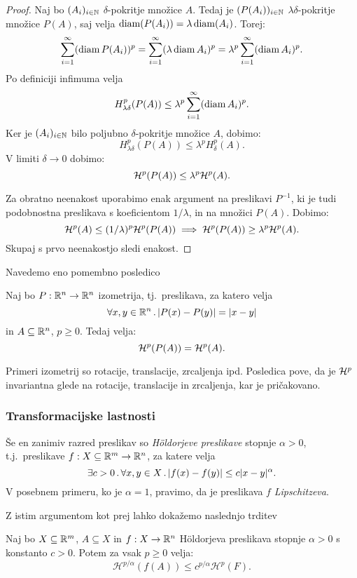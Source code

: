 \begin{proof}
    Naj bo \((A_i)_{i \in \mathbb{N}}\) \(\delta\)-pokritje množice \(A\). Tedaj je \((P(A_i))_{i \in \mathbb{N}}\) \(\lambda \delta\)-pokritje množice \(P(A)\), saj velja \(\operatorname{diam}(P(A_i)) = \lambda \operatorname{diam}(A_i)\). Torej:
    \[\sum_{i=1}^{\infty} (\operatorname{diam} P(A_i))^p = \sum_{i=1}^{\infty}(\lambda \operatorname{diam} A_i)^p = \lambda^p \sum_{i=1}^{\infty}(\operatorname{diam} A_i)^p.\]
    Po definiciji infimuma velja 
    \[H^p_{\lambda \delta} (P(A)) \leq \lambda^p \sum_{i=1}^{\infty}(\operatorname{diam} A_i)^p.\]
    Ker je \((A_i)_{i \in \mathbb{N}}\) bilo poljubno \(\delta\)-pokritje množice \(A\), dobimo:
    \[H^p_{\lambda \delta} (P(A)) \leq \lambda^p H^p_\delta(A).\]
    V limiti \(\delta \to 0\) dobimo:
    \[\mathcal{H}^p (P(A)) \leq \lambda^p \mathcal{H}^p(A).\]    
    
    Za obratno neenakost uporabimo enak argument na preslikavi \(P^{-1}\), ki je tudi podobnostna preslikava s koeficientom \(1/\lambda\), in na množici \(P(A)\). Dobimo:
    \[
        \mathcal{H}^p(A) \leq (1/\lambda)^p \mathcal{H}^p(P(A)) \implies \mathcal{H}^p(P(A)) \geq \lambda^p \mathcal{H}^p(A).
    \]
    Skupaj s prvo neenakostjo sledi enakost.
\end{proof}

Navedemo eno pomembno posledico

\begin{posledica}
    Naj bo \(P: \mathbb{R}^n \to \mathbb{R}^n\) izometrija, tj.\ preslikava, za katero velja
    \[\forall x, y \in \mathbb{R}^n \,.\, |P(x) - P(y)| = |x - y|\]
    in \(A \subseteq \mathbb{R}^n\), \(p \geq 0\). Tedaj velja:
    \[\mathcal{H}^p(P(A)) = \mathcal{H}^p(A).\]    
\end{posledica}

Primeri izometrij so rotacije, translacije, zrcaljenja ipd. Posledica pove, da je \(\mathcal{H}^p\) invariantna glede na rotacije, translacije in zrcaljenja, kar je pričakovano.

\subsubsection{Transformacijske lastnosti}
Še en zanimiv razred preslikav so \emph{H\"oldorjeve preslikave} stopnje \(\alpha > 0\), t.j.\ preslikave \(f: X \subseteq \mathbb{R}^m \to \mathbb{R}^n\), za katere velja
\[\exists c > 0 \,.\, \forall x, y \in X \,.\, |f(x) - f(y)| \leq c|x-y|^\alpha.\]
V posebnem primeru, ko je \(\alpha = 1\), pravimo, da je preslikava \(f\) \emph{Lipschitzeva}.

Z istim argumentom kot prej lahko dokažemo naslednjo trditev
\begin{trditev}
    \label{mera-hold}
    Naj bo \(X \subseteq \mathbb{R}^m\), \(A \subseteq X\) in \(f: X \to \mathbb{R}^n\) Höldorjeva preslikava stopnje \(\alpha > 0\) s konstanto \(c > 0\). Potem za vsak \(p \geq 0\) velja:
    \[\mathcal{H}^{p/\alpha}(f(A)) \leq c^{p/\alpha} \mathcal{H}^p(F).\]
\end{trditev}

